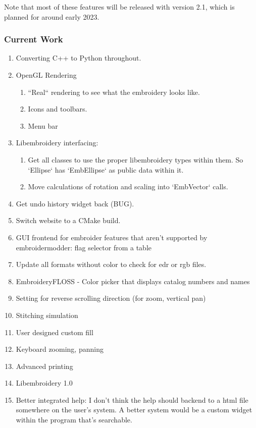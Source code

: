 \documentclass[a4paper, 11pt]{report}
\begin{document}
Note that most of these features will be released with version 2.1, which is planned for around early 2023.

\subsubsection{Current Work}

\begin{enumerate}
\item Converting C++ to Python throughout.
\item OpenGL Rendering
\begin{enumerate}
\item ``Real`` rendering to see what the embroidery looks like.
\item Icons and toolbars.
\item Menu bar
\end{enumerate}
\item Libembroidery interfacing:
\begin{enumerate}
\item Get all classes to use the proper libembroidery types within them.
       So `Ellipse` has `EmbEllipse` as public data within it.
\item Move calculations of rotation and scaling into `EmbVector` calls.
\end{enumerate}
\item Get undo history widget back (BUG).
\item Switch website to a CMake build.
\item GUI frontend for embroider features that aren't supported by embroidermodder: flag selector from a table
\item Update all formats without color to check for edr or rgb files.
\item EmbroideryFLOSS - Color picker that displays catalog numbers and names
\item Setting for reverse scrolling direction (for zoom, vertical pan)
\item Stitching simulation
\item User designed custom fill
\item Keyboard zooming, panning
\item Advanced printing
\item Libembroidery 1.0
\item Better integrated help: I don't think the help should backend to a html file somewhere on the user's system. A better system would be a custom widget within the program that's searchable.

\end{enumerate}
\end{document}
